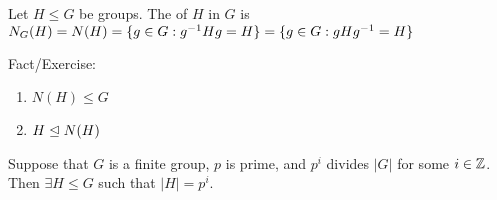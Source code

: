 \documentclass[notes.tex]{subfiles}
\begin{document}

\begin{defn}
	Let $H\le G$ be groups. The  of $H$ in $G$ is $N_G(H) =N(H) = \{g\in G:{g}^{-1}Hg = H\} = \{g\in G:gH{g}^{-1} = H\}$
\end{defn}
Fact/Exercise:
\begin{enumerate}
	\item $N(H) \le G$
	\item $H\trianglelefteq N(H)$
\end{enumerate}
\begin{theorem}[Sylow]
\label{sylow1}
\label{sylow}
	Suppose that $G$ is a finite group, $p$ is prime, and $p^i$ divides $|G|$ for some $i\in \mathbb{Z}$.
	Then $\exists H\le G$ such that $|H| = p^i$.
\end{theorem}
\end{document}
